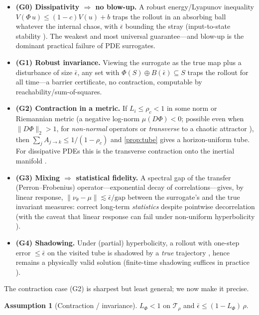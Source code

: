 \documentclass{article}
\theoremstyle{plain}
\theoremstyle{definition}
\newtheorem{assumption}{Assumption}
\theoremstyle{remark}
\newcommand{\state}{u}
\newcommand{\sol}{\Phi}
\newcommand{\tube}{\mathcal{T}_{\rho}}
\begin{document}
\begin{itemize}[leftmargin=1.6em,topsep=2pt,itemsep=2pt]
\item \textbf{(G0) Dissipativity $\Rightarrow$ no blow-up.} A robust energy/Lyapunov inequality
$V(\sol\,\state)\le(1-c)V(\state)+b$ traps the rollout in an absorbing ball whatever the internal chaos, with
$\bar\epsilon$ bounding the stray (input-to-state stability \citep{sontag2008iss}). The weakest and most
universal guarantee---and blow-up is the dominant practical failure of PDE surrogates.
\item \textbf{(G1) Robust invariance.} Viewing the surrogate as the true map plus a disturbance of size
$\bar\epsilon$, any set with $\sol(S)\oplus B(\bar\epsilon)\subseteq S$ traps the rollout for all time---a
barrier certificate, no contraction, computable by reachability/sum-of-squares.
\item \textbf{(G2) Contraction in a metric.} If $L_i\le\rho_c<1$ in some norm or Riemannian metric
(a negative log-norm $\mu(D\sol)<0$; possible even when $\|D\sol\|_2>1$, for \emph{non-normal} operators or
\emph{transverse} to a chaotic attractor \citep{lohmiller1998contraction}), then
$\sum_jA_{j\to k}\le 1/(1-\rho_c)$ and \cref{prop:tube} gives a horizon-uniform tube. For dissipative PDEs
this is the transverse contraction onto the inertial manifold \citep{foias1988inertial,temam1997infinite}.
\item \textbf{(G3) Mixing $\Rightarrow$ statistical fidelity.} A spectral gap of the transfer
(Perron--Frobenius) operator---exponential decay of correlations---gives, by linear response,
$\|\nu_\theta-\mu\|\lesssim\bar\epsilon/\mathrm{gap}$ between the surrogate's and the true invariant
measures: correct long-term \emph{statistics} despite pointwise decorrelation (with the caveat that linear
response can fail under non-uniform hyperbolicity \citep{baladi2014linear}).
\item \textbf{(G4) Shadowing.} Under (partial) hyperbolicity, a rollout with one-step error $\le\bar\epsilon$
on the visited tube is shadowed by a \emph{true} trajectory \citep{bowen1975equilibrium}, hence remains a
physically valid solution (finite-time shadowing suffices in practice \citep{wang2014lss}).
\end{itemize}
The contraction case (G2) is sharpest but least general; we now make it precise.
\begin{assumption}[Contraction / invariance]\label{ass:inv}
$L_{\sol}<1$ on $\tube$ and $\bar\epsilon\le(1-L_{\sol})\,\rho.$
\end{assumption}
\end{document}

